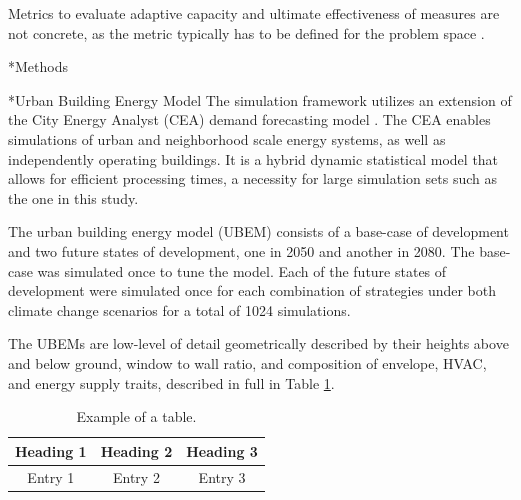 \documentclass[twocolumn, a4paper,10pt]{article}
\makeatletter
\renewcommand\section{\@startsection{section}{1}{\z@}{3pt}{3pt}{\normalfont\large\bfseries}}
\renewcommand\subsection{\@startsection{subsection}{1}{\z@}{\z@}{\z@}{\normalfont\normalsize\bfseries}}
\renewcommand\subsection{\@startsection{subsection}{1}{\z@}{\z@}{0.1pt}{\normalfont\normalsize\bfseries}}
\makeatother
\begin{document}
Metrics to evaluate adaptive capacity and ultimate effectiveness of measures are not concrete, as the metric typically has to be defined for the problem space \citep{brooks 2011}. 


\section*{Methods}

\subsection*{Urban Building Energy Model}
The simulation framework utilizes an extension of the City Energy Analyst (CEA) demand forecasting model \citep{CEA, Fonseca1, Fonseca2}. The CEA enables simulations of urban and neighborhood scale energy systems, as well as independently operating buildings. It is a hybrid dynamic statistical model that allows for efficient processing times, a necessity for large simulation sets such as the one in this study.

The urban building energy model (UBEM) consists of a base-case of development and two future states of development, one in 2050 and another in 2080. The base-case was simulated once to tune the model. Each of the future states of development were simulated once for each combination of strategies under both climate change scenarios for a total of 1024 simulations.  

The UBEMs are low-level of detail geometrically described by their heights above and below ground, window to wall ratio, and composition of envelope, HVAC, and energy supply traits, described in full in Table \ref{tab:model_parameters}. 

\begin{table}[ht]
    \vspace{-5pt}   %
    \caption{Example of a table.}
    \label{tab:model_parameters}
    \centering
    \begin{tabular}{| c | c | c | }
        \hline
        \bf{Heading 1} & \bf{Heading} 2 & \bf{Heading 3} \\
        \hline
        Entry 1 & Entry 2 & Entry 3 \\
        \hline
    \end{tabular}
    \vspace{-5pt}   %
\end{table}
\end{document}

